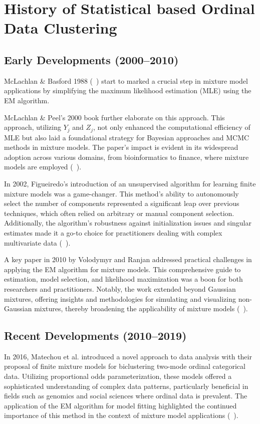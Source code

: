\documentclass{article}
\begin{document}
\section{History of Statistical based Ordinal Data Clustering}

\subsection{Early Developments (2000--2010)}

McLachlan \& Basford 1988 (~\cite{mclachlan1988mixture}) start to marked a crucial step in mixture model applications by simplifying the maximum likelihood estimation (MLE) using the EM algorithm.

McLachlan \& Peel's 2000 book further elaborate on this approach. This approach, utilizing $Y_j$ and $Z_j$, not only enhanced the computational efficiency of MLE but also laid a foundational strategy for Bayesian approaches and MCMC methods in mixture models. The paper’s impact is evident in its widespread adoption across various domains, from bioinformatics to finance, where mixture models are employed (~\cite{mclachlan2000finite}).

In 2002, Figueiredo's introduction of an unsupervised algorithm for learning finite mixture models was a game-changer. This method's ability to autonomously select the number of components represented a significant leap over previous techniques, which often relied on arbitrary or manual component selection. Additionally, the algorithm's robustness against initialization issues and singular estimates made it a go-to choice for practitioners dealing with complex multivariate data (~\cite{figueiredo2002unsupervised}).

A key paper in 2010 by Volodymyr and Ranjan addressed practical challenges in applying the EM algorithm for mixture models. This comprehensive guide to estimation, model selection, and likelihood maximization was a boon for both researchers and practitioners. Notably, the work extended beyond Gaussian mixtures, offering insights and methodologies for simulating and visualizing non-Gaussian mixtures, thereby broadening the applicability of mixture models (~\cite{10.1214/09-SS053}).

\subsection{Recent Developments (2010--2019)}

In 2016, Matechou et al. introduced a novel approach to data analysis with their proposal of finite mixture models for biclustering two-mode ordinal categorical data. Utilizing proportional odds parameterization, these models offered a sophisticated understanding of complex data patterns, particularly beneficial in fields such as genomics and social sciences where ordinal data is prevalent. The application of the EM algorithm for model fitting highlighted the continued importance of this method in the context of mixture model applications (~\cite{matechou2016biclustering}).
\end{document}
